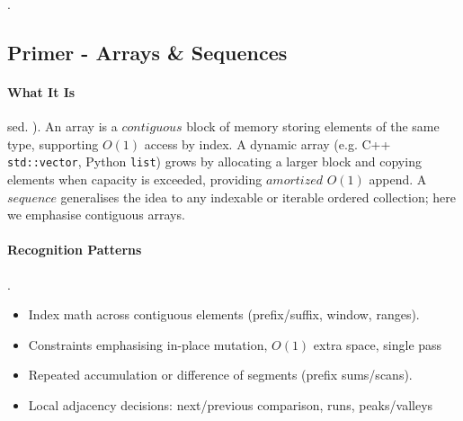 .

\subsection{Primer - Arrays \& Sequences}

\paragraph{What It Is}
sed.
).
An array is a $contiguous$ block of memory storing elements of the same type, supporting $O(1)$ access by index. A dynamic array (e.g. C++ \texttt{std::vector}, Python \texttt{list}) grows by allocating a larger block and copying elements when capacity is exceeded, providing $amortized$ $O(1)$ append. A $sequence$ generalises the idea to any indexable or iterable ordered collection; here we emphasise contiguous arrays.

\paragraph{Recognition Patterns}
.
\begin{itemize}[nosep]
    \item Index math across contiguous elements (prefix/suffix, window, ranges).
    \item Constraints emphasising in-place mutation, $O(1)$ extra space, single pass
    \item Repeated accumulation or difference of segments (prefix sums/scans).
    \item Local adjacency decisions: next/previous comparison, runs, peaks/valleys
\end{itemize}

